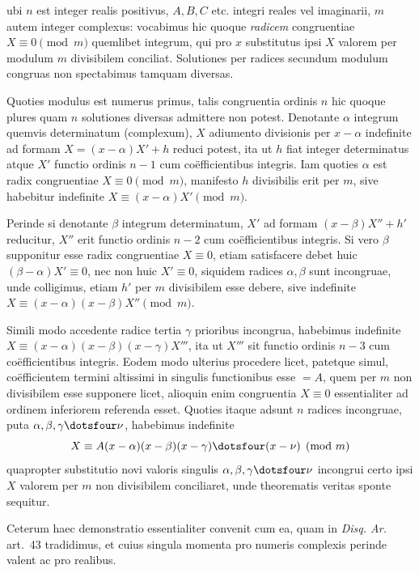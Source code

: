 %
ubi $n$ est integer realis positivus, $A,B,C$ etc. integri reales vel imaginarii, $m$ autem integer complexus: vocabimus hic quoque \emph{radicem} congruentiae $X\equiv0\pmod m$ quemlibet integrum, qui pro $x$ substitutus ipsi $X$ valorem per modulum $m$ divisibilem conciliat. Solutiones per radices secundum modulum congruas non spectabimus tamquam diversas.

Quoties modulus est numerus primus, talis congruentia ordinis $n$ hic quoque plures quam $n$ solutiones diversas admittere non potest. Denotante $\alpha$ integrum quemvis determinatum (complexum), $X$ adiumento divisionis per $x-\alpha$ indefinite ad formam $X=(x-\alpha)X'+h$ reduci potest, ita ut $h$ fiat integer determinatus atque $X'$ functio ordinis $n-1$ cum coëfficientibus integris. Iam quoties $\alpha$ est radix congruentiae $X\equiv0\pmod m$, manifesto $h$ divisibilis erit per $m$, sive habebitur indefinite $X\equiv(x-\alpha)X'\pmod m$.

Perinde si denotante $\beta$ integrum determinatum, $X'$ ad formam $(x-\beta)X''+h'$ reducitur, $X''$ erit functio ordinis $n-2$ cum coëfficientibus integris. Si vero $\beta$ supponitur esse radix congruentiae $X\equiv0$, etiam satisfacere debet huic $(\beta-\alpha)X'\equiv0$, nec non huic $X'\equiv0$, siquidem radices $\alpha,\beta$ sunt incongruae, unde colligimus, etiam $h'$ per $m$ divisibilem esse debere, sive indefinite $X\equiv(x-\alpha)(x-\beta)X''\pmod m$.

Simili modo accedente radice tertia $\gamma$ prioribus incongrua, habebimus indefinite $X\equiv(x-\alpha)(x-\beta)(x-\gamma)X'''$, ita ut $X'''$ sit functio ordinis $n-3$ cum coëfficientibus integris. Eodem modo ulterius procedere licet, patetque simul, coëfficientem termini altissimi in singulis functionibus esse $=A$, quem per $m$ non divisibilem esse supponere licet, alioquin enim congruentia $X\equiv0$ essentialiter ad ordinem inferiorem referenda esset. Quoties itaque adsunt $n$ radices incongruae, puta $\alpha,\beta,\gamma\dotsfour\nu$, habebimus indefinite
\[
X\equiv A(x-\alpha)(x-\beta)(x-\gamma)\dotsfour(x-\nu)\pmod m
\]
quapropter substitutio novi valoris singulis $\alpha,\beta,\gamma\dotsfour\nu$ incongrui certo ipsi $X$ valorem per $m$ non divisibilem conciliaret, unde theorematis veritas sponte sequitur.

Ceterum haec demonstratio essentialiter convenit cum ea, quam in \emph{Disq. Ar.} art.~43 tradidimus, et cuius singula momenta pro numeris complexis perinde valent ac pro realibus.

